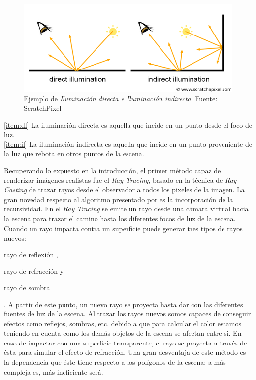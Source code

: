 \documentclass[titlepage,12pt]{report}
\begin{document}
\begin{figure}[!ht]
	\centering
	\includegraphics[scale=0.45]{media/shad2-globalillum3.png}
	\caption{Ejemplo de \textit{Iluminación directa e Iluminación indirecta}. Fuente: ScratchPixel}
	\label{globalil}
\end{figure}

\ref{item:dl} La iluminación directa es aquella que incide en un punto desde el foco de luz. \\
\ref{item:il} La iluminación indirecta es aquella que incide en un punto proveniente de la luz que rebota en otros puntos de la escena.

Recuperando lo expuesto en la introducción, el primer método capaz de renderizar imágenes realistas fue el \textit{Ray Tracing}, basado en la técnica de \textit{Ray Casting} de trazar rayos desde el observador a todos los pixeles de la imagen. La gran novedad respecto al algoritmo presentado por \citep{Appel1968} es la incorporación de la recursividad. En el \textit{Ray Tracing} se emite un rayo desde una cámara virtual hacia la escena para trazar el camino hasta los diferentes focos de luz de la escena. Cuando un rayo impacta contra un superficie puede generar tres tipos de rayos nuevos: \begin{enumerate*}[label=\roman*)] \item rayo de reflexión \label{ray:reflected}, \item rayo de refracción y \item rayo de sombra \end{enumerate*}. A partir de este punto, un nuevo rayo se proyecta hasta dar con las diferentes fuentes de luz de la escena. Al trazar los rayos nuevos somos capaces de conseguir efectos como reflejos, sombras, etc. debido a que para calcular el color estamos teniendo en cuenta como los demás objetos de la escena se afectan entre si. En caso de impactar con una superficie transparente, el rayo se proyecta a través de ésta para simular el efecto de refracción. Una gran desventaja de este método es la dependencia que éste tiene respecto a los polígonos de la escena; a más compleja es, más ineficiente será. 
\end{document}
